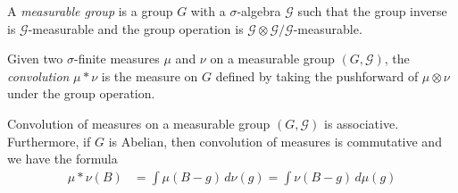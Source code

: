 \begin{defn}A \emph{measurable group} is a group $G$ with a
  $\sigma$-algebra $\mathcal{G}$ such that the group inverse is
$\mathcal{G}$-measurable and the group operation is $\mathcal{G}
\otimes \mathcal{G} / \mathcal{G}$-measurable.
\end{defn}
\begin{defn}Given two $\sigma$-finite measures $\mu$ and $\nu$ on a measurable group
  $(G, \mathcal{G})$, the \emph{convolution} $\mu * \nu$ is the measure on $G$ defined
  by taking the pushforward of $\mu \otimes \nu$ under the group operation.
\end{defn}
\begin{lem}\label{Convolution}Convolution of measures on a measurable group $(G,
  \mathcal{G})$ is associative.  Furthermore, if $G$ is Abelian, then
  convolution of measures is commutative and we have the formula
\begin{align*}
\mu * \nu (B) &= \int \mu(B - g) \, d \nu(g) = \int \nu(B - g) \,  d \mu(g)
\end{align*}
\end{lem}
